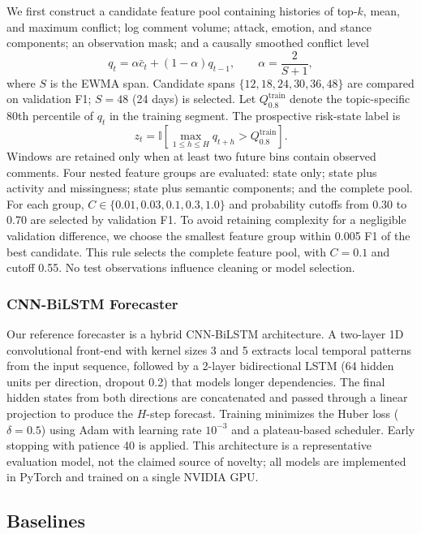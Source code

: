 \documentclass[journal]{IEEEtran}
\begin{document}
We first construct a candidate feature pool containing histories of top-$k$, mean, and maximum conflict; log comment volume; attack, emotion, and stance components; an observation mask; and a causally smoothed conflict level
\begin{equation}
q_t = \alpha \bar{c}_t + (1-\alpha)q_{t-1}, \qquad \alpha=\frac{2}{S+1},
\end{equation}
where $S$ is the EWMA span. Candidate spans $\{12,18,24,30,36,48\}$ are compared on validation F1; $S=48$ (24 days) is selected. Let $Q_{0.8}^{\mathrm{train}}$ denote the topic-specific 80th percentile of $q_t$ in the training segment. The prospective risk-state label is
\begin{equation}
z_t=\mathbb{I}\!\left[\max_{1\le h\le H}q_{t+h}>Q_{0.8}^{\mathrm{train}}\right].
\end{equation}
Windows are retained only when at least two future bins contain observed comments. Four nested feature groups are evaluated: state only; state plus activity and missingness; state plus semantic components; and the complete pool. For each group, $C\in\{0.01,0.03,0.1,0.3,1.0\}$ and probability cutoffs from 0.30 to 0.70 are selected by validation F1. To avoid retaining complexity for a negligible validation difference, we choose the smallest feature group within 0.005 F1 of the best candidate. This rule selects the complete feature pool, with $C=0.1$ and cutoff 0.55. No test observations influence cleaning or model selection.

\subsubsection{CNN-BiLSTM Forecaster}

Our reference forecaster is a hybrid CNN-BiLSTM architecture. A two-layer 1D convolutional front-end with kernel sizes 3 and 5 extracts local temporal patterns from the input sequence, followed by a 2-layer bidirectional LSTM (64 hidden units per direction, dropout 0.2) that models longer dependencies. The final hidden states from both directions are concatenated and passed through a linear projection to produce the $H$-step forecast. Training minimizes the Huber loss ($\delta=0.5$) using Adam with learning rate $10^{-3}$ and a plateau-based scheduler. Early stopping with patience 40 is applied. This architecture is a representative evaluation model, not the claimed source of novelty; all models are implemented in PyTorch and trained on a single NVIDIA GPU.

\subsection{Baselines}
\end{document}
